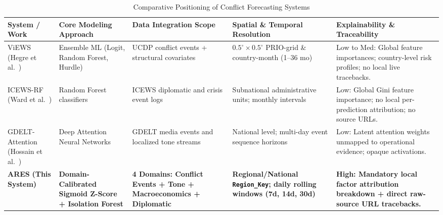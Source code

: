 \documentclass[preprint,12pt]{elsarticle}
\begin{document}
\begin{table}[htbp]
\centering
\footnotesize
\caption{Comparative Positioning of Conflict Forecasting Systems}
\label{tab:comparative}
\begin{tabularx}{\textwidth}{>{\raggedright\arraybackslash\hsize=1.10\hsize}X >{\raggedright\arraybackslash\hsize=1.00\hsize}X >{\raggedright\arraybackslash\hsize=1.00\hsize}X >{\raggedright\arraybackslash\hsize=0.90\hsize}X >{\raggedright\arraybackslash\hsize=1.00\hsize}X}
\toprule
\textbf{System / Work} & \textbf{Core Modeling Approach} & \textbf{Data Integration Scope} & \textbf{Spatial \& Temporal Resolution} & \textbf{Explainability \& Traceability} \\
\midrule
ViEWS \newline (Hegre et al.~\cite{hegre2019views, hegre2018forecasting, hegre2019predicting}) & Ensemble ML (Logit, Random Forest, Hurdle) & UCDP conflict events + structural covariates & $0.5^\circ \times 0.5^\circ$ PRIO-grid \& country-month (1--36 mo) & Low to Med: Global feature importances; country-level risk profiles; no local live tracebacks. \\
\addlinespace
ICEWS-RF \newline (Ward et al.~\cite{ward2013predicting}) & Random Forest classifiers & ICEWS diplomatic and crisis event logs & Subnational administrative units; monthly intervals & Low: Global Gini feature importance; no local per-prediction attribution; no source URLs. \\
\addlinespace
GDELT-Attention \newline (Hossain et al.~\cite{hossain2023identifying}) & Deep Attention Neural Networks & GDELT media events and localized tone streams & National level; multi-day event sequence horizons & Low: Latent attention weights unmapped to operational evidence; opaque activations. \\
\addlinespace
\textbf{ARES} \newline \textbf{(This System)} & \textbf{Domain-Calibrated Sigmoid Z-Score + Isolation Forest} & \textbf{4 Domains: Conflict Events + Tone + Macroeconomics + Diplomatic} & \textbf{Regional/National \texttt{Region\_Key}; daily rolling windows (7d, 14d, 30d)} & \textbf{High: Mandatory local factor attribution breakdown + direct raw-source URL tracebacks.} \\
\bottomrule
\end{tabularx}
\end{table}

\end{document}
